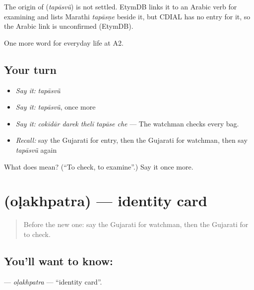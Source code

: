 \begin{cousinweb}
The origin of \textbf{} (\emph{tapāsvũ}) is not settled. EtymDB links it to an Arabic verb for examining and lists Marathi \emph{tapāsṇe} beside it, but CDIAL has no entry for it, so the Arabic link is unconfirmed (EtymDB).
\end{cousinweb}

\begin{grammarlens}[title={What you've built}]
One more word for everyday life at A2.
\end{grammarlens}

\subsection*{Your turn}
\begin{itemize}
\raggedright
  \item \emph{Say it:} \emph{tapāsvũ}
  \item \emph{Say it:} \emph{tapāsvũ}, once more
  \item \emph{Say it:} \emph{cokīdār darek thelī tapāse che} — The watchman checks every bag.
  \item \emph{Recall:} say the Gujarati for entry, then the Gujarati for watchman, then say \emph{tapāsvũ} again
\end{itemize}

\begin{tcolorbox}[breakable,colback=teal!4,colframe=teal!35!black,title={Before you move on}]
What does  mean? (\textquotedblleft{}To check, to examine\textquotedblright{}.) Say it once more.
\end{tcolorbox}
\section[\texorpdfstring{\gu{ઓળખપત્ર} (oḷakhpatra)}{ઓળખપત્ર (oḷakhpatra)}]{ (oḷakhpatra) — identity card}

\label{lesson:GU-C197-olakhpatra}



\begin{quote}
Before the new one: say the Gujarati for watchman, then the Gujarati for to check.
\end{quote}

\subsection*{You'll want to know: }
\textbf{} — \emph{oḷakhpatra} — \textquotedblleft{}identity card\textquotedblright{}.

